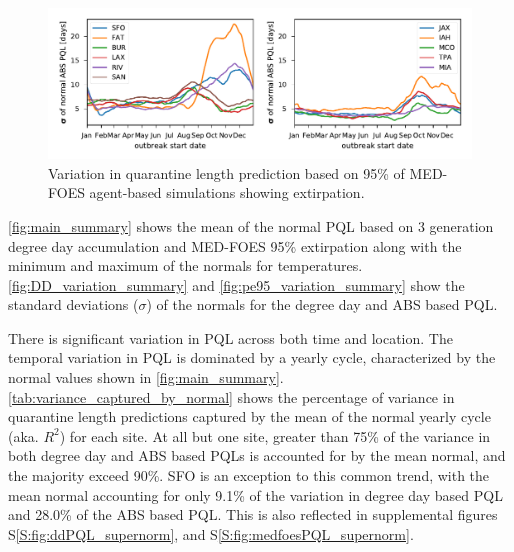 \documentclass[10pt,a4paper,twocolumn]{article}
\begin{document}
\begin{figure}[ht!]
\centering
\includegraphics{figs/fig_pe95_variation.pdf}
\caption{\label{fig:pe95_variation_summary}Variation in quarantine length prediction 
based on 95\% of MED-FOES agent-based simulations showing extirpation.}
\end{figure}


\autoref{fig:main_summary} shows 
the mean of the normal PQL based on 3 generation degree day accumulation 
and MED-FOES 95\% extirpation
along with the minimum and maximum of the normals for temperatures.
\autoref{fig:DD_variation_summary} and \autoref{fig:pe95_variation_summary} show the 
standard deviations ($\sigma$) of the normals for the degree day and ABS based PQL.

There is significant variation in PQL across both time and location.
The temporal variation in PQL is dominated by a yearly cycle, 
characterized by the normal values shown in \autoref{fig:main_summary}.
\autoref{tab:variance_captured_by_normal} shows the percentage of variance in 
quarantine length predictions captured by the mean of the normal yearly cycle (aka. $R^2$) for each site.
At all but one site, greater than 75\% of the variance in both degree day and ABS based PQLs
is accounted for by the mean normal, and the majority exceed 90\%.
SFO is an exception to this common trend, with the mean normal accounting for only 9.1\% of the variation in 
degree day based PQL and 28.0\% of the ABS based PQL.
This is also reflected in supplemental figures
S\ref{S:fig:ddPQL_supernorm},
and S\ref{S:fig:medfoesPQL_supernorm}.
\end{document}
